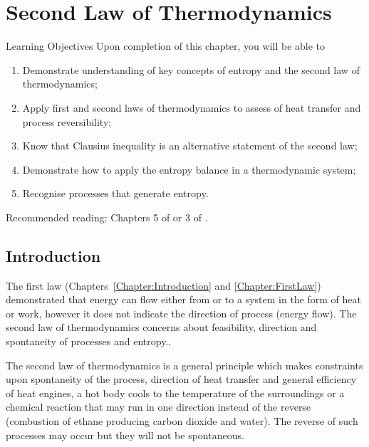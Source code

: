 
\chapter{Second Law of Thermodynamics}\label{Chapter:SecondLaw}

   \begin{LearningObjectivesBlock}{Learning Objectives}
      Upon completion of this chapter, you will be able to
        \begin{enumerate}
           \item Demonstrate understanding of key concepts of entropy and the second law of thermodynamics;
           \item Apply first and second laws of thermodynamics to assess of heat transfer and process reversibility;
           \item Know that Clausius inequality is an alternative statement of the second law;
           \item Demonstrate how to apply the entropy balance in a thermodynamic system;
           \item Recognise processes that generate entropy.
        \end{enumerate}
\medskip
     Recommended reading: Chapters 5 of \citet{SmithVanNess_Book,Moran_Book,Borgnakke_Book} or 3 of \citet{Atkins_Book}.
   \end{LearningObjectivesBlock}

\localtableofcontents


  
   \section{Introduction}\label{Chapter:SecondLaw:Section:Intro}
   The first law (Chapters~\ref{Chapter:Introduction} and \ref{Chapter:FirstLaw}) demonstrated that energy can flow either from or to a system in the form of heat or work, however it does not indicate the direction of process (\ie energy flow). The second law of thermodynamics concerns about feasibility, direction and spontaneity of processes and entropy..
   
The second law of thermodynamics is a general principle which makes constraints upon spontaneity of the process, direction of heat transfer and general efficiency of heat engines, \eg a hot body cools to the temperature of the surroundings or a chemical reaction that may run in one direction instead of the reverse (\eg combustion of ethane producing carbon dioxide and water). The reverse of such processes may occur but they will not be spontaneous.  
  
